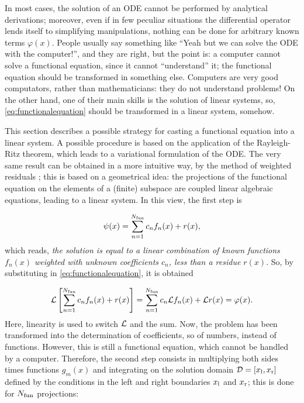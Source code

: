 \documentclass[a4paper,12pt]{article}
\begin{document}
In most cases, the solution of an ODE cannot be performed by analytical derivations; moreover, even if in few peculiar situations the differential operator lends itself to simplifying manipulations, nothing can be done for arbitrary known terms $\varphi(x)$. People usually say something like ``Yeah but we can solve the ODE with the computer!'', and they are right, but the point is: a computer cannot solve a functional equation, since it cannot ``understand'' it; the functional equation should be transformed in something else. Computers are very good computators, rather than mathematicians: they do not understand problems! On the other hand, one of their main skills is the solution of linear systems, so, \eqref{eq:functionalequation} should be transformed in a linear system, somehow. 

This section describes a possible strategy for casting a functional equation into a linear system. A possible procedure is based on the application of the Rayleigh-Ritz theorem, which leads to a variational formulation of the ODE. The very same result can be obtained in a more intuitive way, by the method of weighted residuals \cite{vichnevetsky}; this is based on a geometrical idea: the projections of the functional equation on the elements of a (finite) subspace are coupled linear algebraic equations, leading to a linear system. In this view, the first step is

\begin{equation}
\psi(x) = \sum_{n=1}^{N_{\mathrm{fun}}} c_n f_n(x) + r(x),
\label{eq:approxpsi}
\end{equation}
which reads, \textit{the solution is equal to a linear combination of known functions $f_n(x)$ weighted with unknown coefficients $c_n$, less than a residue $r(x)$}. So, by substituting in \eqref{eq:functionalequation}, it is obtained

\[
\mathcal{L} \left[ \sum_{n=1}^{N_{\mathrm{fun}}} c_n f_n(x) + r(x) \right] = \sum_{n=1}^{N_{\mathrm{fun}}} c_n \mathcal{L} f_n(x) + \mathcal{L} r(x) = \varphi(x).  
\]
Here, linearity is used to switch $\mathcal{L}$ and the sum. Now, the problem has been transformed into the determination of coefficients, so of numbers, instead of functions. However, this is still a functional equation, which cannot be handled by a computer. Therefore, the second step consists in multiplying both sides times functions $g_m(x)$ and integrating on the solution domain $\mathcal{D} = [x_{\mathrm{l}},x_{\mathrm{r}}]$ defined by the conditions in the left and right boundaries $x_{\mathrm{l}}$ and $x_{\mathrm{r}}$; this is done for $N_{\mathrm{fun}}$ projections:
\end{document}
